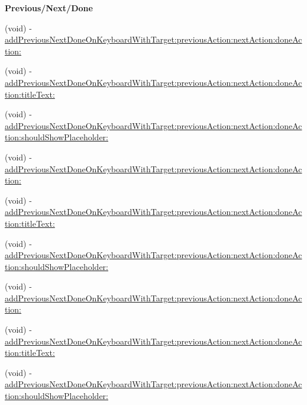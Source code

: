 \begin{Indent}\textbf{ Previous/\+Next/\+Done}\par
{\em 

 

 }\begin{DoxyCompactItemize}
\item 
(void) -\/ \mbox{\hyperlink{category_u_i_view_07_i_q_toolbar_addition_08_adf2d5bd843bcf262dcd871334b7d8898}{add\+Previous\+Next\+Done\+On\+Keyboard\+With\+Target\+:previous\+Action\+:next\+Action\+:done\+Action\+:}}
\item 
(void) -\/ \mbox{\hyperlink{category_u_i_view_07_i_q_toolbar_addition_08_a3711d631fe9b1e4a8f76c0b8adc6b06c}{add\+Previous\+Next\+Done\+On\+Keyboard\+With\+Target\+:previous\+Action\+:next\+Action\+:done\+Action\+:title\+Text\+:}}
\item 
(void) -\/ \mbox{\hyperlink{category_u_i_view_07_i_q_toolbar_addition_08_a7451be65d0dca47b389d816d81c49789}{add\+Previous\+Next\+Done\+On\+Keyboard\+With\+Target\+:previous\+Action\+:next\+Action\+:done\+Action\+:should\+Show\+Placeholder\+:}}
\item 
(void) -\/ \mbox{\hyperlink{category_u_i_view_07_i_q_toolbar_addition_08_adf2d5bd843bcf262dcd871334b7d8898}{add\+Previous\+Next\+Done\+On\+Keyboard\+With\+Target\+:previous\+Action\+:next\+Action\+:done\+Action\+:}}
\item 
(void) -\/ \mbox{\hyperlink{category_u_i_view_07_i_q_toolbar_addition_08_a3711d631fe9b1e4a8f76c0b8adc6b06c}{add\+Previous\+Next\+Done\+On\+Keyboard\+With\+Target\+:previous\+Action\+:next\+Action\+:done\+Action\+:title\+Text\+:}}
\item 
(void) -\/ \mbox{\hyperlink{category_u_i_view_07_i_q_toolbar_addition_08_a7451be65d0dca47b389d816d81c49789}{add\+Previous\+Next\+Done\+On\+Keyboard\+With\+Target\+:previous\+Action\+:next\+Action\+:done\+Action\+:should\+Show\+Placeholder\+:}}
\item 
(void) -\/ \mbox{\hyperlink{category_u_i_view_07_i_q_toolbar_addition_08_adf2d5bd843bcf262dcd871334b7d8898}{add\+Previous\+Next\+Done\+On\+Keyboard\+With\+Target\+:previous\+Action\+:next\+Action\+:done\+Action\+:}}
\item 
(void) -\/ \mbox{\hyperlink{category_u_i_view_07_i_q_toolbar_addition_08_a3711d631fe9b1e4a8f76c0b8adc6b06c}{add\+Previous\+Next\+Done\+On\+Keyboard\+With\+Target\+:previous\+Action\+:next\+Action\+:done\+Action\+:title\+Text\+:}}
\item 
(void) -\/ \mbox{\hyperlink{category_u_i_view_07_i_q_toolbar_addition_08_a7451be65d0dca47b389d816d81c49789}{add\+Previous\+Next\+Done\+On\+Keyboard\+With\+Target\+:previous\+Action\+:next\+Action\+:done\+Action\+:should\+Show\+Placeholder\+:}}
\end{DoxyCompactItemize}
\end{Indent}
